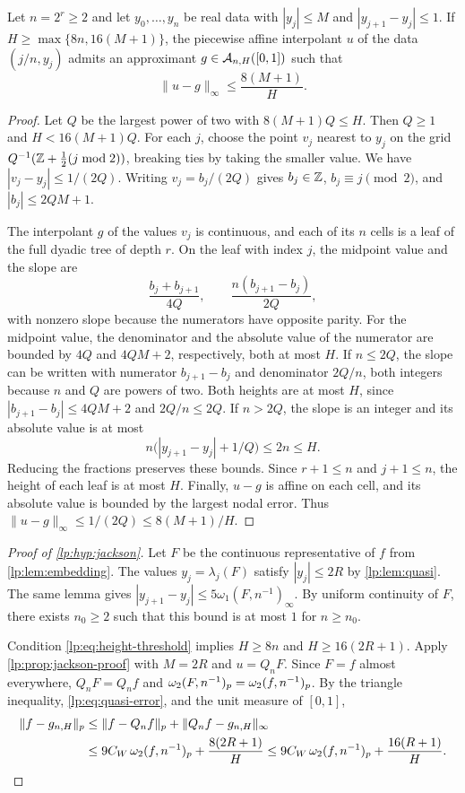 \documentclass[11pt,a4paper]{article}
\begin{document}
\begin{lema}
\label{lp:prop:jackson-proof}
Let $n=2^r\ge2$ and let $y_0,\ldots,y_n$ be real data with $|y_j|\le M$ and $|y_{j+1}-y_j|\le1$. If $H\ge\max\{8n,16(M+1)\}$, the piecewise affine interpolant $u$ of the data $(j/n,y_j)$ admits an approximant $g\in\mathcal A_{n,H}([0,1])$ such that
\[
 \|u-g\|_\infty\le\frac{8(M+1)}{H}.
\]
\end{lema}

\begin{proof}
Let $Q$ be the largest power of two with $8(M+1)Q\le H$. Then $Q\ge1$ and $H<16(M+1)Q$. For each $j$, choose the point $v_j$ nearest to $y_j$ on the grid
$Q^{-1}(\mathbb Z+\tfrac12(j\bmod 2))$, breaking ties by taking the smaller value. We have $|v_j-y_j|\le1/(2Q)$. Writing $v_j=b_j/(2Q)$ gives $b_j\in\mathbb Z$, $b_j\equiv j\pmod 2$, and $|b_j|\le2QM+1$.

The interpolant $g$ of the values $v_j$ is continuous, and each of its $n$ cells is a leaf of the full dyadic tree of depth $r$. On the leaf with index $j$, the midpoint value and the slope are
\[
 \frac{b_j+b_{j+1}}{4Q},
 \qquad
 \frac{n(b_{j+1}-b_j)}{2Q},
\]
with nonzero slope because the numerators have opposite parity. For the midpoint value, the denominator and the absolute value of the numerator are bounded by $4Q$ and $4QM+2$, respectively, both at most $H$. If $n\le2Q$, the slope can be written with numerator $b_{j+1}-b_j$ and denominator $2Q/n$, both integers because $n$ and $Q$ are powers of two. Both heights are at most $H$, since $|b_{j+1}-b_j|\le4QM+2$ and $2Q/n\le2Q$. If $n>2Q$, the slope is an integer and its absolute value is at most
\[
 n\bigl(|y_{j+1}-y_j|+1/Q\bigr)\le2n\le H.
\]
Reducing the fractions preserves these bounds. Since $r+1\le n$ and $j+1\le n$, the height of each leaf is at most $H$. Finally, $u-g$ is affine on each cell, and its absolute value is bounded by the largest nodal error. Thus $\|u-g\|_\infty\le1/(2Q)\le8(M+1)/H$.
\end{proof}

\begin{proof}[Proof of \cref{lp:hyp:jackson}]
Let $F$ be the continuous representative of $f$ from \cref{lp:lem:embedding}. The values $y_j=\lambda_j(F)$ satisfy $|y_j|\le2R$ by \cref{lp:lem:quasi}. The same lemma gives
$|y_{j+1}-y_j|\le5\omega_1(F,n^{-1})_\infty$. By uniform continuity of $F$, there exists $n_0\ge2$ such that this bound is at most $1$ for $n\ge n_0$.

Condition \eqref{lp:eq:height-threshold} implies $H\ge8n$ and $H\ge16(2R+1)$. Apply \cref{lp:prop:jackson-proof} with $M=2R$ and $u=Q_nF$. Since $F=f$ almost everywhere, $Q_nF=Q_nf$ and $\omega_2(F,n^{-1})_{p}=\omega_2(f,n^{-1})_{p}$. By the triangle inequality, \eqref{lp:eq:quasi-error}, and the unit measure of $[0,1]$,
\begin{align*}
 \|f-g_{n,H}\|_p
 &\le\|f-Q_nf\|_p+\|Q_nf-g_{n,H}\|_\infty\\
 &\le9C_W\,\omega_2(f,n^{-1})_{p}+\frac{8(2R+1)}{H}
 \le9C_W\,\omega_2(f,n^{-1})_{p}+\frac{16(R+1)}{H}.\qedhere
\end{align*}
\end{proof}
\end{document}
